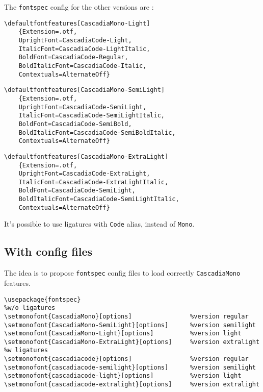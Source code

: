 \documentclass{article}
\begin{document}
The \texttt{fontspec} config for the other versions are :

\begin{lstlisting}[language={[latex]TeX},basicstyle=\footnotesize\ttfamily,commentstyle=\itshape\color{gray},keywordstyle=\color{magenta},tabsize=4,frame=single]
\defaultfontfeatures[CascadiaMono-Light]
    {Extension=.otf,
    UprightFont=CascadiaCode-Light,
    ItalicFont=CascadiaCode-LightItalic,
    BoldFont=CascadiaCode-Regular,
    BoldItalicFont=CascadiaCode-Italic,
    Contextuals=AlternateOff}
\end{lstlisting}

\begin{lstlisting}[language={[latex]TeX},basicstyle=\footnotesize\ttfamily,commentstyle=\itshape\color{gray},keywordstyle=\color{magenta},tabsize=4,frame=single]
\defaultfontfeatures[CascadiaMono-SemiLight]
    {Extension=.otf,
    UprightFont=CascadiaCode-SemiLight,
    ItalicFont=CascadiaCode-SemiLightItalic,
    BoldFont=CascadiaCode-SemiBold,
    BoldItalicFont=CascadiaCode-SemiBoldItalic,
    Contextuals=AlternateOff}
\end{lstlisting}

\begin{lstlisting}[language={[latex]TeX},basicstyle=\footnotesize\ttfamily,commentstyle=\itshape\color{gray},keywordstyle=\color{magenta},tabsize=4,frame=single]
\defaultfontfeatures[CascadiaMono-ExtraLight]
    {Extension=.otf,
    UprightFont=CascadiaCode-ExtraLight,
    ItalicFont=CascadiaCode-ExtraLightItalic,
    BoldFont=CascadiaCode-SemiLight,
    BoldItalicFont=CascadiaCode-SemiLightItalic,
    Contextuals=AlternateOff}
\end{lstlisting}

It's possible to use ligatures with \texttt{Code} alias, instead of \texttt{Mono}.

\pagebreak

\subsection{With config files}

The idea is to propose \texttt{fontspec} config files to load correctly \texttt{CascadiaMono} features.

\begin{lstlisting}[language={[latex]TeX},basicstyle=\footnotesize\ttfamily,commentstyle=\itshape\color{gray},keywordstyle=\color{magenta},tabsize=4,frame=single]
\usepackage{fontspec}
%w/o ligatures
\setmonofont{CascadiaMono}[options]                %version regular
\setmonofont{CascadiaMono-SemiLight}[options]      %version semilight
\setmonofont{CascadiaMono-Light}[options]          %version light
\setmonofont{CascadiaMono-ExtraLight}[options]     %version extralight
%w ligatures
\setmonofont{cascadiacode}[options]                %version regular
\setmonofont{cascadiacode-semilight}[options]      %version semilight
\setmonofont{cascadiacode-light}[options]          %version light
\setmonofont{cascadiacode-extralight}[options]     %version extralight
\end{lstlisting}
\end{document}
